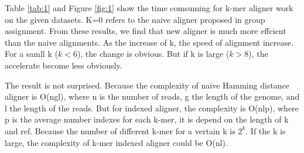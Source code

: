 \documentclass[a4paper]{article}
\begin{document}
Table \ref{tab:1} and Figure \ref{fig:1} show the time comsuming for k-mer aligner work on the given datasets. K=0 refers to the naive aligner proposed in group assignment. From these results, we find that new aligner is much more effcient than the naive alignments. As the increase of k, the speed of alignment increase. For a samll k ($k<6$), the change is obvious. But if k is large ($k>8$), the accelerate become less obviously.

The result is not surprised. Because the  complexity of naive Hamming distance aligner is O(ngl), where n is the number of reads, g the length of the genome, and l the length of the reads. But for indexed aligner, the complexity is O(nlp), where p is the average number indexes for each k-mer, it is depend on the length of k and ref. Because the number of different k-mer for a vertain k is $2^k$. If the k is large, the complexity of k-mer indexed aligner could be O(nl).
\end{document}
